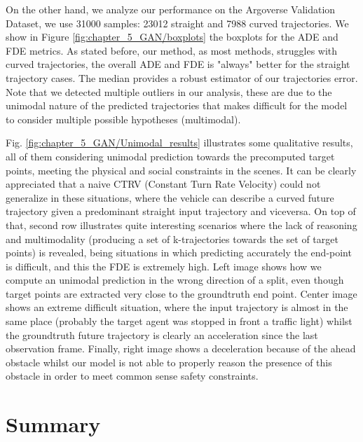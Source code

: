 On the other hand, we analyze our performance on the Argoverse Validation Dataset, we use 31000 samples: 23012 straight and 7988 curved trajectories. We show in Figure \ref{fig:chapter_5_GAN/boxplots} the boxplots for the ADE and FDE metrics. As stated before, our method, as most methods, struggles with curved trajectories, the overall ADE and FDE is "always" better for the straight trajectory cases. The median provides a robust estimator of our trajectories error. Note that we detected multiple outliers in our analysis, these are due to the unimodal nature of the predicted trajectories that makes difficult for the model to consider multiple possible hypotheses (multimodal). 

Fig. \ref{fig:chapter_5_GAN/Unimodal_results} illustrates some qualitative results, all of them considering unimodal prediction towards the precomputed target points, meeting the physical and social constraints in the scenes. It can be clearly appreciated that a naive CTRV (Constant Turn Rate Velocity) could not generalize in these situations, where the vehicle can describe a curved future trajectory given a predominant straight input trajectory and viceversa. On top of that, second row illustrates quite interesting scenarios where the lack of reasoning and multimodality (producing a set of k-trajectories towards the set of target points) is revealed, being situations in which predicting accurately the end-point is difficult, and this the FDE is extremely high. Left image shows how we compute an unimodal prediction in the wrong direction of a split, even though target points are extracted very close to the groundtruth end point. Center image shows an extreme difficult situation, where the input trajectory is almost in the same place (probably the target agent was stopped in front a traffic light) whilst the groundtruth future trajectory is clearly an acceleration since the last observation frame. Finally, right image shows a deceleration because of the ahead obstacle whilst our model is not able to properly reason the presence of this obstacle in order to meet common sense safety constraints.

\section{Summary}
\label{sec:5_summary}